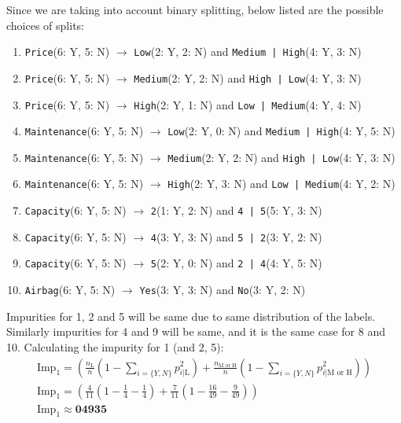 \documentclass{article}
\begin{document}
\begin{flushleft}
Since we are taking into account binary splitting, below listed are the possible choices of splits:
\begin{enumerate}
\item \texttt{Price}(6: Y, 5: N) \(\rightarrow\) \texttt{Low}(2: Y, 2: N) and \texttt{Medium | High}(4: Y, 3: N) 
\item \texttt{Price}(6: Y, 5: N) \(\rightarrow\) \texttt{Medium}(2: Y, 2: N) and \texttt{High | Low}(4: Y, 3: N)
\item \texttt{Price}(6: Y, 5: N) \(\rightarrow\) \texttt{High}(2: Y, 1: N) and \texttt{Low | Medium}(4: Y, 4: N)
\item \texttt{Maintenance}(6: Y, 5: N) \(\rightarrow\) \texttt{Low}(2: Y, 0: N) and \texttt{Medium | High}(4: Y, 5: N)
\item \texttt{Maintenance}(6: Y, 5: N) \(\rightarrow\) \texttt{Medium}(2: Y, 2: N) and \texttt{High | Low}(4: Y, 3: N)
\item \texttt{Maintenance}(6: Y, 5: N) \(\rightarrow\) \texttt{High}(2: Y, 3: N) and \texttt{Low | Medium}(4: Y, 2: N)
\item \texttt{Capacity}(6: Y, 5: N) \(\rightarrow\) \texttt{2}(1: Y, 2: N) and \texttt{4 | 5}(5: Y, 3: N)
\item \texttt{Capacity}(6: Y, 5: N) \(\rightarrow\) \texttt{4}(3: Y, 3: N) and \texttt{5 | 2}(3: Y, 2: N)
\item \texttt{Capacity}(6: Y, 5: N) \(\rightarrow\) \texttt{5}(2: Y, 0: N) and \texttt{2 | 4}(4: Y, 5: N)
\item \texttt{Airbag}(6: Y, 5: N) \(\rightarrow\) \texttt{Yes}(3: Y, 3: N) and \texttt{No}(3: Y, 2: N)
\end{enumerate}

Impurities for 1, 2 and 5 will be same due to same distribution of the labels. Similarly impurities for 4 and 9 will be same, and it is the same case for 8 and 10.
Calculating the impurity for 1 (and 2, 5):
\begin{gather*}
\text{Imp}_{1} = \left(\frac{n_{\text{L}}}{n} \left(1 - \sum_{i = \{Y, N\}} p_{i | \text{L}}^{2}\right) + \frac{n_{\text{M or H}}}{n} \left(1 - \sum_{i = \{Y, N\}} p_{i | \text{M or H}}^{2}\right)\right) \\
\text{Imp}_{1} = \left(\frac{4}{11} \left(1 - \frac{1}{4} - \frac{1}{4}\right) + \frac{7}{11} \left(1 - \frac{16}{49} - \frac{9}{49}\right)\right) \\
\text{Imp}_{1} \approx \mathbf{0 4935}
\end{gather*}


\end{flushleft}
\end{document}
